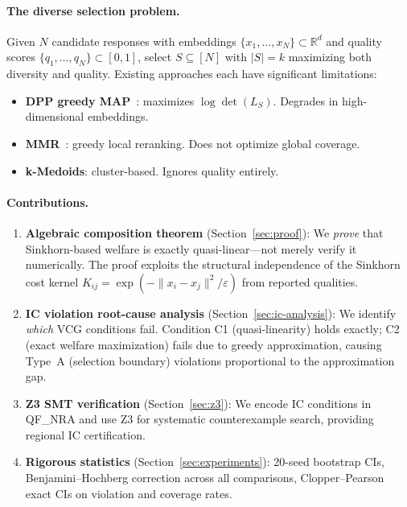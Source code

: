 \documentclass[10pt]{article}
\begin{document}
\paragraph{The diverse selection problem.}
Given $N$ candidate responses with embeddings $\{x_1, \ldots, x_N\} \subset \mathbb{R}^d$ and quality scores $\{q_1, \ldots, q_N\} \subset [0,1]$, select $S \subseteq [N]$ with $|S| = k$ maximizing both diversity and quality.
Existing approaches each have significant limitations:
\begin{itemize}[leftmargin=*,itemsep=1pt]
  \item \textbf{DPP greedy MAP}~\citep{kulesza2012determinantal}: maximizes $\log\det(L_S)$. Degrades in high-dimensional embeddings.
  \item \textbf{MMR}~\citep{carbonell1998mmr}: greedy local reranking. Does not optimize global coverage.
  \item \textbf{k-Medoids}: cluster-based. Ignores quality entirely.
\end{itemize}

\paragraph{Contributions.}
\begin{enumerate}[leftmargin=*,itemsep=2pt]
  \item \textbf{Algebraic composition theorem} (Section~\ref{sec:proof}): We \emph{prove} that Sinkhorn-based welfare is exactly quasi-linear---not merely verify it numerically. The proof exploits the structural independence of the Sinkhorn cost kernel $K_{ij} = \exp(-\|x_i - x_j\|^2/\varepsilon)$ from reported qualities.
  \item \textbf{IC violation root-cause analysis} (Section~\ref{sec:ic-analysis}): We identify \emph{which} VCG conditions fail. Condition C1 (quasi-linearity) holds exactly; C2 (exact welfare maximization) fails due to greedy approximation, causing Type~A (selection boundary) violations proportional to the approximation gap.
  \item \textbf{Z3 SMT verification} (Section~\ref{sec:z3}): We encode IC conditions in QF\_NRA and use Z3 for systematic counterexample search, providing regional IC certification.
  \item \textbf{Rigorous statistics} (Section~\ref{sec:experiments}): 20-seed bootstrap CIs, Benjamini--Hochberg correction across all comparisons, Clopper--Pearson exact CIs on violation and coverage rates.
\end{enumerate}
\end{document}
